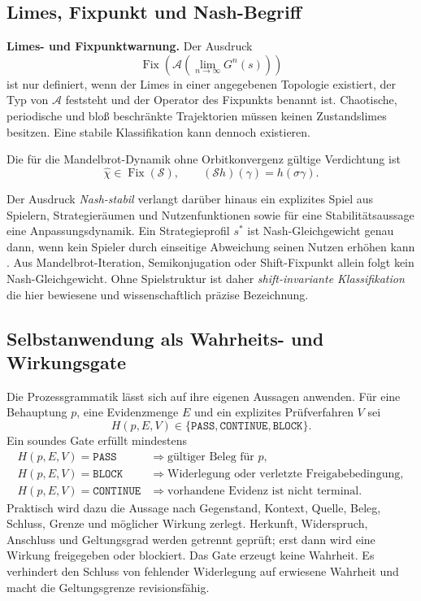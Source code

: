 \documentclass[11pt,a4paper]{article}
\theoremstyle{remark}
\newcommand{\Fix}{\operatorname{Fix}}
\newcommand{\PASS}{\texttt{PASS}}
\newcommand{\CONTINUE}{\texttt{CONTINUE}}
\newcommand{\BLOCK}{\texttt{BLOCK}}
\newcommand{\statusbox}[2]{%
  \par\medskip\noindent
  \colorbox{#1}{\parbox{\dimexpr\linewidth-2\fboxsep\relax}{#2}}%
  \par\medskip
}
\begin{document}
\subsection{Limes, Fixpunkt und Nash-Begriff}

\statusbox{QAmber}{
\textbf{Limes- und Fixpunktwarnung.}
Der Ausdruck
\[
  \Fix\!\left(\mathcal A\!\left(\lim_{n\to\infty}G^n(s)\right)\right)
\]
ist nur definiert, wenn der Limes in einer angegebenen Topologie existiert,
der Typ von \(\mathcal A\) feststeht und der Operator des Fixpunkts benannt
ist. Chaotische, periodische und bloß beschränkte Trajektorien müssen keinen
Zustandslimes besitzen. Eine stabile Klassifikation kann dennoch existieren.
}

Die für die Mandelbrot-Dynamik ohne Orbitkonvergenz gültige Verdichtung ist
\[
  \boxed{\widehat\chi\in\Fix(\mathcal S)},
  \qquad (\mathcal S h)(\gamma)=h(\sigma\gamma).
\]

Der Ausdruck \emph{Nash-stabil} verlangt darüber hinaus ein explizites Spiel
aus Spielern, Strategieräumen und Nutzenfunktionen sowie für eine
Stabilitätsaussage eine Anpassungsdynamik. Ein Strategieprofil \(s^*\) ist
Nash-Gleichgewicht genau dann, wenn kein Spieler durch einseitige Abweichung
seinen Nutzen erhöhen kann \citep{nash1950}. Aus Mandelbrot-Iteration,
Semikonjugation oder Shift-Fixpunkt allein folgt kein Nash-Gleichgewicht.
Ohne Spielstruktur ist daher \emph{shift-invariante Klassifikation} die hier
bewiesene und wissenschaftlich präzise Bezeichnung.

\subsection{Selbstanwendung als Wahrheits- und Wirkungsgate}

Die Prozessgrammatik lässt sich auf ihre eigenen Aussagen anwenden. Für eine
Behauptung \(p\), eine Evidenzmenge \(E\) und ein explizites Prüfverfahren
\(V\) sei
\[
  H(p,E,V)\in\{\PASS,\CONTINUE,\BLOCK\}.
\]
Ein soundes Gate erfüllt mindestens
\[
\begin{aligned}
H(p,E,V)=\PASS
&\Longrightarrow\text{gültiger Beleg für }p,\\
H(p,E,V)=\BLOCK
&\Longrightarrow\text{Widerlegung oder verletzte Freigabebedingung},\\
H(p,E,V)=\CONTINUE
&\Longrightarrow\text{vorhandene Evidenz ist nicht terminal}.
\end{aligned}
\]
Praktisch wird dazu die Aussage nach Gegenstand, Kontext, Quelle, Beleg,
Schluss, Grenze und möglicher Wirkung zerlegt. Herkunft, Widerspruch,
Anschluss und Geltungsgrad werden getrennt geprüft; erst dann wird eine
Wirkung freigegeben oder blockiert. Das Gate erzeugt keine Wahrheit. Es
verhindert den Schluss von fehlender Widerlegung auf erwiesene Wahrheit und
macht die Geltungsgrenze revisionsfähig.
\end{document}
